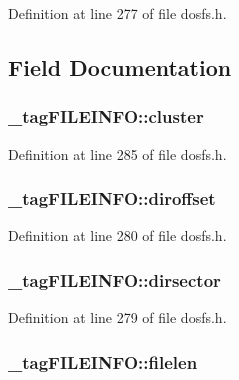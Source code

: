 Definition at line 277 of file dosfs.\-h.



\subsection{Field Documentation}
\hypertarget{struct__tag_f_i_l_e_i_n_f_o_a5f5528fc511f81d31dbd191f01bd77b9}{
\subsubsection[{cluster}]{ \-\_\-tag\-F\-I\-L\-E\-I\-N\-F\-O\-::cluster}}\label{struct__tag_f_i_l_e_i_n_f_o_a5f5528fc511f81d31dbd191f01bd77b9}


Definition at line 285 of file dosfs.\-h.

\hypertarget{struct__tag_f_i_l_e_i_n_f_o_a8f9f5838873de9b6660388ca21d2c648}{
\subsubsection[{diroffset}]{ \-\_\-tag\-F\-I\-L\-E\-I\-N\-F\-O\-::diroffset}}\label{struct__tag_f_i_l_e_i_n_f_o_a8f9f5838873de9b6660388ca21d2c648}


Definition at line 280 of file dosfs.\-h.

\hypertarget{struct__tag_f_i_l_e_i_n_f_o_a1cbbd31889eb0626a1d562f9ba6c1900}{
\subsubsection[{dirsector}]{ \-\_\-tag\-F\-I\-L\-E\-I\-N\-F\-O\-::dirsector}}\label{struct__tag_f_i_l_e_i_n_f_o_a1cbbd31889eb0626a1d562f9ba6c1900}


Definition at line 279 of file dosfs.\-h.

\hypertarget{struct__tag_f_i_l_e_i_n_f_o_ab62951fccfa808ccf0d5fe5be7f8c4b1}{
\subsubsection[{filelen}]{ \-\_\-tag\-F\-I\-L\-E\-I\-N\-F\-O\-::filelen}}\label{struct__tag_f_i_l_e_i_n_f_o_ab62951fccfa808ccf0d5fe5be7f8c4b1}


